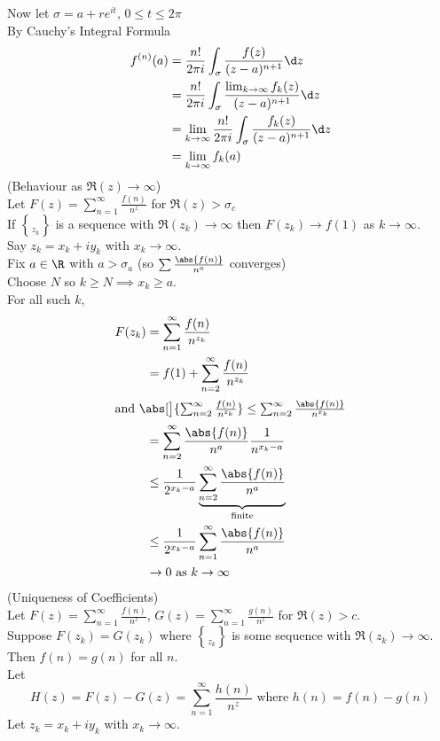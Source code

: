 Now let $\sigma=a+re^{it}$, $0\leq t\leq 2\pi$ \\
By Cauchy's Integral Formula
\begin{align*}
f^{(n)}(a) &= \frac{n!}{2\pi i} \int_\sigma \frac{f(z)}{(z-a)^{n+1}} \d z \\
&= \frac{n!}{2\pi i}\int_\sigma \frac{\lim_{k\to\infty} f_k(z)}{(z-a)^{n+1}} \d z \\
&= \lim_{k\to\infty} \frac{n!}{2\pi i} \int_\sigma \frac{f_k(z)}{(z-a)^{n+1}} \d z \\
&= \lim_{k\to\infty}f_k(a)
\end{align*}
\thm (Behaviour as $\Re(z)\to\infty$) \\
Let $F(z)=\sum_{n=1}^\infty\frac{f(n)}{n^z}$ for $\Re(z)>\sigma_c$ \\
If $\brace{z_k}$ is a sequence with $\Re(z_k)\to\infty$ then $F(z_k)\to f(1)$ as $k\to\infty$. \\
\pf Say $z_k=x_k+iy_k$ with $x_k\to\infty$. \\
Fix $a\in\R$ with $a>\sigma_a$ (so $\sum\frac{\abs{f(n)}}{n^a}$ converges) \\
Choose $N$ so $k\geq N\implies x_k\geq a$. \\
For all such $k$,
\begin{align*}
F(z_k) &= \sum_{n=1}^\infty \frac{f(n)}{n^{z_k}} \\
&= f(1) + \sum_{n=2}^\infty \frac{f(n)}{n^{z_k}} \\ \intertext{and $\abs[\big]{\sum_{n=2}^\infty\frac{f(n)}{n^{z_k}}}\leq\sum_{n=2}^\infty\frac{\abs{f(n)}}{n^{x_k}}$}
&= \sum_{n=2}^\infty \frac{\abs{f(n)}}{n^a} \frac{1}{n^{x_k-a}} \\
&\leq \frac{1}{2^{x_k-a}} \underbrace{\sum_{n=2}^\infty \frac{\abs{f(n)}}{n^a}}_{\text{finite}} \\
&\leq \frac{1}{2^{x_k-a}} \sum_{n=1}^\infty \frac{\abs{f(n)}}{n^a} \\
&\to 0 \text{ as } k\to\infty
\end{align*}
\thm (Uniqueness of Coefficients) \\
Let $F(z)=\sum_{n=1}^\infty\frac{f(n)}{n^z}$, $G(z)=\sum_{n=1}^\infty\frac{g(n)}{n^z}$ for $\Re(z)>c$. \\
Suppose $F(z_k)=G(z_k)$ where $\brace{z_k}$ is some sequence with $\Re(z_k)\to\infty$. \\
Then $f(n)=g(n)$ for all $n$. \\
\pf Let
\[ H(z) = F(z) - G(z) = \sum_{n=1}^\infty \frac{h(n)}{n^z} \text{ where $h(n)=f(n)-g(n)$} \]
Let $z_k=x_k+iy_k$ with $x_k\to\infty$. \\
